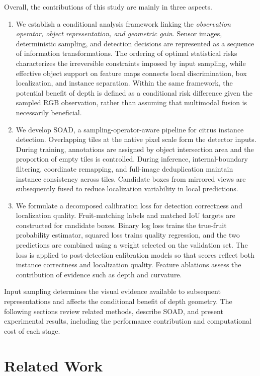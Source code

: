\documentclass[11pt,a4paper]{article}
\begin{document}
Overall, the contributions of this study are mainly in three aspects.
\begin{enumerate}
\item We establish a conditional analysis framework linking the \emph{observation operator, object representation, and geometric gain}. Sensor images, deterministic sampling, and detection decisions are represented as a sequence of information transformations. The ordering of optimal statistical risks characterizes the irreversible constraints imposed by input sampling, while effective object support on feature maps connects local discrimination, box localization, and instance separation. Within the same framework, the potential benefit of depth is defined as a conditional risk difference given the sampled RGB observation, rather than assuming that multimodal fusion is necessarily beneficial.
\item We develop SOAD, a sampling-operator-aware pipeline for citrus instance detection. Overlapping tiles at the native pixel scale form the detector inputs. During training, annotations are assigned by object intersection area and the proportion of empty tiles is controlled. During inference, internal-boundary filtering, coordinate remapping, and full-image deduplication maintain instance consistency across tiles. Candidate boxes from mirrored views are subsequently fused to reduce localization variability in local predictions.
\item We formulate a decomposed calibration loss for detection correctness and localization quality. Fruit-matching labels and matched IoU targets are constructed for candidate boxes. Binary log loss trains the true-fruit probability estimator, squared loss trains quality regression, and the two predictions are combined using a weight selected on the validation set. The loss is applied to post-detection calibration models so that scores reflect both instance correctness and localization quality. Feature ablations assess the contribution of evidence such as depth and curvature.
\end{enumerate}

Input sampling determines the visual evidence available to subsequent representations and affects the conditional benefit of depth geometry. The following sections review related methods, describe SOAD, and present experimental results, including the performance contribution and computational cost of each stage.

\section{Related Work}
\end{document}
